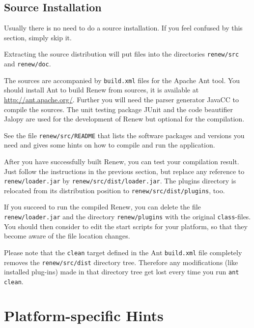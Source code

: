 \subsection{Source Installation}\label{subsec:sourceinst}

Usually there is no need to do a source installation.
If you feel confused by this section, simply skip it.

Extracting the source distribution will put files into the directories
\texttt{renew\renewversion/src} and \texttt{renew\renewversion/doc}.

The sources are accompanied by \texttt{build.xml}
files for the Apache Ant tool.
You should install Ant to build Renew from sources, it is available at
\url{http://ant.apache.org/}.
Further you will need the parser generator JavaCC to compile the sources.
The unit testing package JUnit and the code beautifier Jalopy are used for the development of Renew but optional for the compilation.

See the file \texttt{renew\renewversion/src/README} that lists the
software packages and versions you need and gives some hints on how
to compile and run the application.

After you have successfully built Renew, you can test your compilation
result.
Just follow the instructions in the previous section, but replace any
reference to
\texttt{renew\renewversion/loader.jar} by 
\texttt{renew\renewversion/src/dist/loader.jar}.
The plugins directory is relocated from
its distribution position to
\texttt{renew\renewversion/src/dist/plugins}, too.

If you succeed to run the compiled Renew, you can delete the file
\texttt{renew\renewversion/loader.jar} and the directory
\texttt{renew\renewversion/plugins} with
the original \texttt{class}-files.
You should then consider to edit the start scripts for your
platform, so that they become aware of the file location changes.

Please note that the \texttt{clean} target defined in the Ant
\texttt{build.xml} file completely removes the
\texttt{renew\renewversion/src/dist} directory tree.
Therefore any modifications (like installed plug-ins) made in
that directory tree get lost every time you run \texttt{ant clean}.

\section{Platform-specific Hints}\label{sec:plathints}

